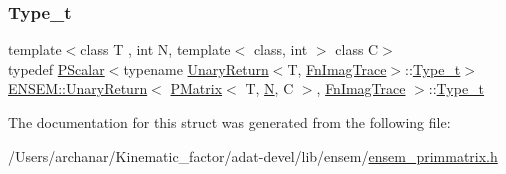 \subsubsection{\texorpdfstring{Type\_t}{Type\_t}\hspace{0.1cm}{\footnotesize\ttfamily [3/3]}}
{\footnotesize\ttfamily template$<$class T , int N, template$<$ class, int $>$ class C$>$ \\
typedef \mbox{\hyperlink{classENSEM_1_1PScalar}{P\+Scalar}}$<$typename \mbox{\hyperlink{structENSEM_1_1UnaryReturn}{Unary\+Return}}$<$T, \mbox{\hyperlink{structENSEM_1_1FnImagTrace}{Fn\+Imag\+Trace}}$>$\+::\mbox{\hyperlink{structENSEM_1_1UnaryReturn_3_01PMatrix_3_01T_00_01N_00_01C_01_4_00_01FnImagTrace_01_4_a631e4d167f62becbde56ab9d33138ccd}{Type\+\_\+t}}$>$ \mbox{\hyperlink{structENSEM_1_1UnaryReturn}{E\+N\+S\+E\+M\+::\+Unary\+Return}}$<$ \mbox{\hyperlink{classENSEM_1_1PMatrix}{P\+Matrix}}$<$ T, \mbox{\hyperlink{adat__devel_2lib_2hadron_2operator__name__util_8cc_a7722c8ecbb62d99aee7ce68b1752f337}{N}}, C $>$, \mbox{\hyperlink{structENSEM_1_1FnImagTrace}{Fn\+Imag\+Trace}} $>$\+::\mbox{\hyperlink{structENSEM_1_1UnaryReturn_3_01PMatrix_3_01T_00_01N_00_01C_01_4_00_01FnImagTrace_01_4_a631e4d167f62becbde56ab9d33138ccd}{Type\+\_\+t}}}



The documentation for this struct was generated from the following file\+:\begin{DoxyCompactItemize}
\item 
/\+Users/archanar/\+Kinematic\+\_\+factor/adat-\/devel/lib/ensem/\mbox{\hyperlink{adat-devel_2lib_2ensem_2ensem__primmatrix_8h}{ensem\+\_\+primmatrix.\+h}}\end{DoxyCompactItemize}
